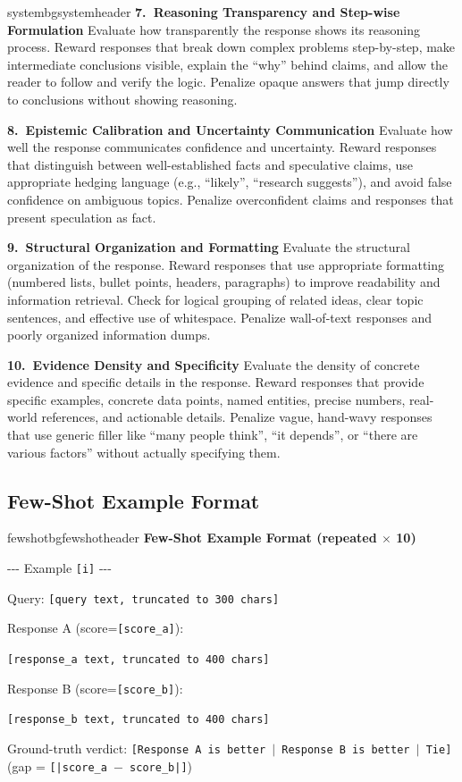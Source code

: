 \documentclass[11pt]{article}
\newcommand{\pgreen}[1]{{\color{promptgreen}\texttt{#1}}}
\begin{document}
\begin{promptbox}{systembg}{systemheader}
\textbf{7.~Reasoning Transparency and Step-wise Formulation}\quad
Evaluate how transparently the response shows its reasoning process. Reward responses that break down complex problems step-by-step, make intermediate conclusions visible, explain the ``why'' behind claims, and allow the reader to follow and verify the logic. Penalize opaque answers that jump directly to conclusions without showing reasoning.

\textbf{8.~Epistemic Calibration and Uncertainty Communication}\quad
Evaluate how well the response communicates confidence and uncertainty. Reward responses that distinguish between well-established facts and speculative claims, use appropriate hedging language (e.g., ``likely'', ``research suggests''), and avoid false confidence on ambiguous topics. Penalize overconfident claims and responses that present speculation as fact.

\textbf{9.~Structural Organization and Formatting}\quad
Evaluate the structural organization of the response. Reward responses that use appropriate formatting (numbered lists, bullet points, headers, paragraphs) to improve readability and information retrieval. Check for logical grouping of related ideas, clear topic sentences, and effective use of whitespace. Penalize wall-of-text responses and poorly organized information dumps.

\textbf{10.~Evidence Density and Specificity}\quad
Evaluate the density of concrete evidence and specific details in the response. Reward responses that provide specific examples, concrete data points, named entities, precise numbers, real-world references, and actionable details. Penalize vague, hand-wavy responses that use generic filler like ``many people think'', ``it depends'', or ``there are various factors'' without actually specifying them.
\end{promptbox}

\subsection{Few-Shot Example Format}\label{app:fewshot}

\begin{promptbox}{fewshotbg}{fewshotheader}
\textbf{Few-Shot Example Format (repeated $\times$ 10)}

\medskip
-{}-{}- Example \pgreen{[i]} -{}-{}-

Query: \pgreen{[query text, truncated to 300 chars]}

Response A (score=\pgreen{[score\_a]}):

\pgreen{[response\_a text, truncated to 400 chars]}

Response B (score=\pgreen{[score\_b]}):

\pgreen{[response\_b text, truncated to 400 chars]}

Ground-truth verdict: \pgreen{[Response A is better $|$ Response B is better $|$ Tie]} (gap = \pgreen{[|score\_a $-$ score\_b|]})
\end{promptbox}
\end{document}

